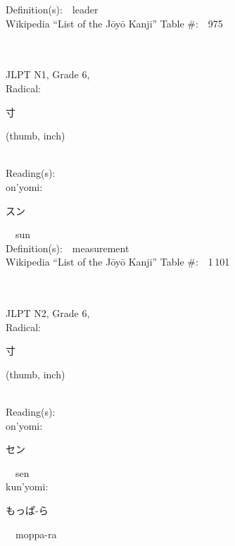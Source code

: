 \begin{multicols}{2}
Definition(s):\ \ leader \\
Wikipedia ``List of the J\=oy\=o Kanji'' Table \#:\ \ 975 \\
\ \ \\
{\fontsize{34pt}{40pt}  }\ \ \\  %
{JLPT N1, Grade 6, \\Radical:\ \ {\begin{CJK}{UTF8}{min} 寸 \end{CJK}} (thumb, inch) } \\
Reading(s):\ \ \\
{\hspace*{1em}}on'yomi:\ \ \\
{\hspace*{2em}}{\begin{CJK}{UTF8}{min} スン \end{CJK}}\ \ sun\ \ \\
Definition(s):\ \ measurement \\
Wikipedia ``List of the J\=oy\=o Kanji'' Table \#:\ \ 1\,101 \\
\ \ \\
{\fontsize{34pt}{40pt}  }\ \ \\  %
{JLPT N2, Grade 6, \\Radical:\ \ {\begin{CJK}{UTF8}{min} 寸 \end{CJK}} (thumb, inch) } \\
Reading(s):\ \ \\
{\hspace*{1em}}on'yomi:\ \ \\
{\hspace*{2em}}{\begin{CJK}{UTF8}{min} セン \end{CJK}}\ \ sen\ \ \\
{\hspace*{1em}}kun'yomi:\ \ \\
{\hspace*{2em}}{\begin{CJK}{UTF8}{min} もっぱ-ら \end{CJK}}\ \ moppa-ra\ \ \\

\end{multicols}
